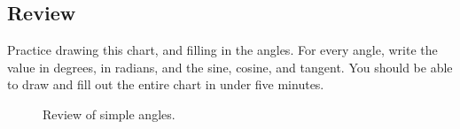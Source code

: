 \clearpage
\subsection{Review}

Practice drawing this chart, and filling in the angles.  For every angle, write the value in degrees, in radians, and the sine, cosine, and tangent.  You should be able to draw and fill out the entire chart in under five minutes.\\

\begin{figure}[htb]
\center
\caption{Review of simple angles.}
\label{fig:review of simple angles}
\end{figure}

